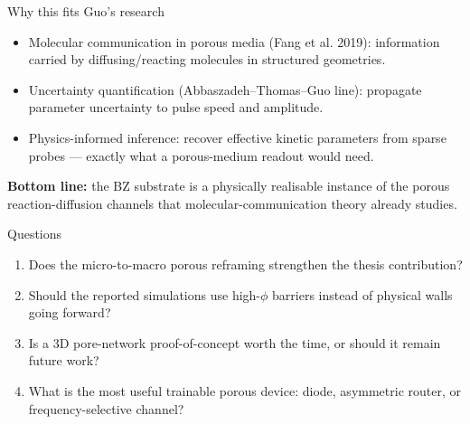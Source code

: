 \documentclass[aspectratio=169,11pt]{beamer}
\newcommand{\etal}{et al.}
\begin{document}
\begin{frame}{Why this fits Guo's research}

\begin{itemize}
    \item Molecular communication in porous media (Fang \etal{} 2019): information carried by diffusing/reacting molecules in structured geometries.
    \item Uncertainty quantification (Abbaszadeh--Thomas--Guo line): propagate parameter uncertainty to pulse speed and amplitude.
    \item Physics-informed inference: recover effective kinetic parameters from sparse probes --- exactly what a porous-medium readout would need.
\end{itemize}

\vspace{0.3cm}
\textbf{Bottom line:} the BZ substrate is a physically realisable instance of the porous reaction-diffusion channels that molecular-communication theory already studies.

\end{frame}

\begin{frame}{Questions}

\begin{enumerate}
    \item Does the micro-to-macro porous reframing strengthen the thesis contribution?
    \item Should the reported simulations use high-$\phi$ barriers instead of physical walls going forward?
    \item Is a 3D pore-network proof-of-concept worth the time, or should it remain future work?
    \item What is the most useful trainable porous device: diode, asymmetric router, or frequency-selective channel?
\end{enumerate}

\end{frame}
\end{document}
